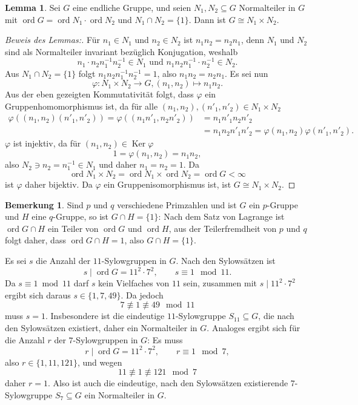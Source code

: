 \documentclass[a4paper,10pt]{article}
\theoremstyle{definition}
\newtheorem{bem}[beh]{Bemerkung}
\newtheorem{lem}[beh]{Lemma}
\newcommand{\ord}{\operatorname{ord}}
\newcommand{\Ker}{\operatorname{Ker}}
\begin{document}
\begin{lem}\label{lem:normalprodukt}
 Sei $G$ eine endliche Gruppe, und seien $N_1, N_2 \subseteq G$ Normalteiler in $G$ mit $\ord G = \ord N_1 \cdot \ord N_2$ und $N_1 \cap N_2 = \{1\}$. Dann ist $G \cong N_1 \times N_2$.
\end{lem}
\begin{proof}[Beweis des Lemmas:]
 Für $n_1 \in N_1$ und $n_2 \in N_2$ ist $n_1 n_2 = n_2 n_1$, denn $N_1$ und $N_2$ sind als Normalteiler invariant bezüglich Konjugation, weshalb
 \[
  n_1 \cdot n_2 n_1^{-1} n_2^{-1} \in N_1 \text{ und }
  n_1 n_2 n_1^{-1} \cdot n_2^{-1} \in N_2.
 \]
 Aus $N_1 \cap N_2 = \{1\}$ folgt $n_1 n_2 n_1^{-1} n_2^{-1} = 1$, also $n_1 n_2 = n_2 n_1$. Es sei nun
 \[
  \varphi : N_1 \times N_2 \rightarrow G, (n_1, n_2) \mapsto n_1 n_2.
 \]
 Aus der eben gezeigten Kommutativität folgt, dass $\varphi$ ein Gruppenhomomorphismus ist, da für alle $(n_1,n_2), (n'_1, n'_2) \in N_1 \times N_2$
 \begin{align*}
  \varphi( (n_1,n_2) (n'_1, n'_2) )
  = \varphi( (n_1 n'_1, n_2 n'_2) )
  &= n_1 n'_1 n_2 n'_2 \\
  &= n_1 n_2 n'_1 n'_2
  = \varphi(n_1, n_2) \varphi(n'_1, n'_2).
 \end{align*}
 $\varphi$ ist injektiv, da für $(n_1, n_2) \in \Ker \varphi$
 \[
  1 = \varphi(n_1, n_2) = n_1 n_2,
 \]
 also $N_2 \ni n_2 = n_1^{-1} \in N_1$ und daher $n_1 = n_2 = 1$. Da
 \[
  \ord N_1 \times N_2 = \ord N_1 \times \ord N_2 = \ord G < \infty
 \]
 ist $\varphi$ daher bijektiv. Da $\varphi$ ein Gruppenisomorphismus ist, ist $G \cong N_1 \times N_2$.
\end{proof}

\begin{bem}\label{bem:primschnitt}
 Sind $p$ und $q$ verschiedene Primzahlen und ist $G$ ein $p$-Gruppe und $H$ eine $q$-Gruppe, so ist $G \cap H = \{1\}$: Nach dem Satz von Lagrange ist $\ord G \cap H$ ein Teiler von $\ord G$ und $\ord H$, aus der Teilerfremdheit von $p$ und $q$ folgt daher, dass $\ord G \cap H = 1$, also $G \cap H = \{1\}$.
\end{bem}


Es sei $s$ die Anzahl der $11$-Sylowgruppen in $G$. Nach den Sylowsätzen ist
\[
 s \mid \ord G = 11^2 \cdot 7^2, \qquad s \equiv 1 \mod 11.
\]
Da $s \equiv 1 \bmod 11$ darf $s$ kein Vielfaches von $11$ sein, zusammen mit $s \mid 11^2 \cdot 7^2$ ergibt sich daraus $s \in \{1,7,49\}$. Da jedoch
\[
 7 \not\equiv 1 \not\equiv 49 \mod 11
\]
muss $s = 1$. Insbesondere ist die eindeutige $11$-Sylowgruppe $S_{11} \subseteq G$, die nach den Sylowsätzen existiert, daher ein Normalteiler in $G$.
Analoges ergibt sich für die Anzahl $r$ der $7$-Sylowgruppen in $G$: Es muss
\[
 r \mid \ord G = 11^2 \cdot 7^2, \qquad r \equiv 1 \mod 7,
\]
also $r \in \{1,11,121\}$, und wegen
\[
 11 \not\equiv 1 \not\equiv 121 \mod 7
\]
daher $r = 1$. Also ist auch die eindeutige, nach den Sylowsätzen existierende $7$-Sylowgruppe $S_7 \subseteq G$ ein Normalteiler in $G$.
\end{document}
